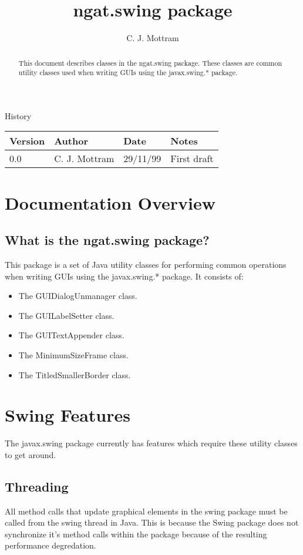 \documentclass[10pt,a4paper]{article}
\title{ngat.swing package}
\author{C. J. Mottram}
\date{}
\begin{document}
\thispagestyle{empty}
\maketitle
\begin{abstract}
This document describes classes in the ngat.swing package.
These classes are common utility classes used when writing GUIs using the javax.swing.* package.
\end{abstract}

\centerline{\Large History}
\begin{center}
\begin{tabular}{|l|l|l|p{15em}|}
\hline
{\bf Version} & {\bf Author} & {\bf Date} & {\bf Notes} \\
\hline
0.0 &              C. J. Mottram & 29/11/99 & First draft \\
\hline
\end{tabular}
\end{center}

\newpage
\tableofcontents
\listoffigures
\listoftables
\newpage

\section{Documentation Overview}
\subsection{What is the ngat.swing package?}
This package is a set of Java utility classes for performing common operations
when writing GUIs using the javax.swing.* package.
It consists of:
\begin{itemize}
\item The GUIDialogUnmanager class.
\item The GUILabelSetter class.
\item The GUITextAppender class.
\item The MinimumSizeFrame class.
\item The TitledSmallerBorder class.
\end{itemize}


\section{Swing Features}
The javax.swing package currently has features which require these utility classes to get around.

\subsection{Threading}
All method calls that update graphical elements in the swing package must be called from the swing thread in Java.
This is because the Swing package does not synchronize it's method calls within the package because of
the resulting performance degredation.
\end{document}
